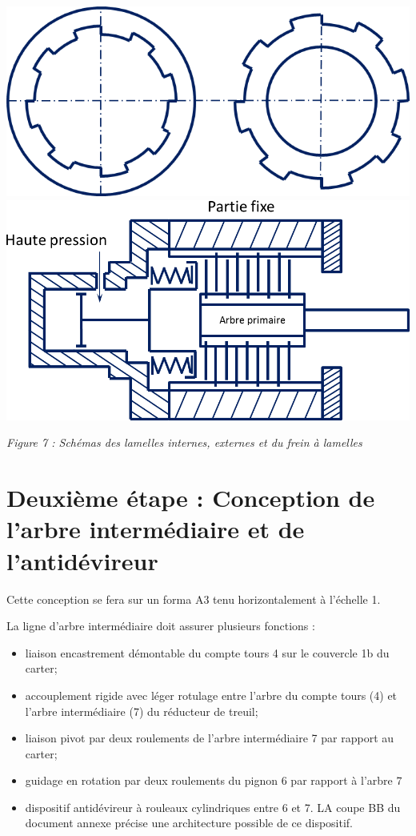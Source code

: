 \documentclass[10pt]{article}
\begin{document}
\begin{center}
\includegraphics[width=.4\textwidth]{images/lamelles}\hfill
\includegraphics[width=.45\textwidth]{images/frein}

\textit{Figure 7 : Schémas des lamelles internes, externes et du frein à lamelles}
\end{center}

\section{Deuxième étape : Conception de l'arbre intermédiaire et de l'antidévireur}

Cette conception se fera sur un forma A3 tenu horizontalement à l'échelle 1.

La ligne d'arbre intermédiaire doit assurer plusieurs fonctions :
\begin{itemize}
\item liaison encastrement démontable du compte tours 4 sur le couvercle 1b du carter;
\item accouplement rigide avec léger rotulage entre l'arbre du compte tours (4) et l'arbre intermédiaire (7) du réducteur de treuil;
\item liaison pivot par deux roulements de l'arbre intermédiaire 7 par rapport au carter;
\item guidage en rotation par deux roulements du pignon 6 par rapport à l'arbre 7
\item dispositif antidévireur à rouleaux cylindriques entre 6 et 7. LA coupe BB du document annexe précise une architecture possible de ce dispositif. 
\end{itemize}
\end{document}
